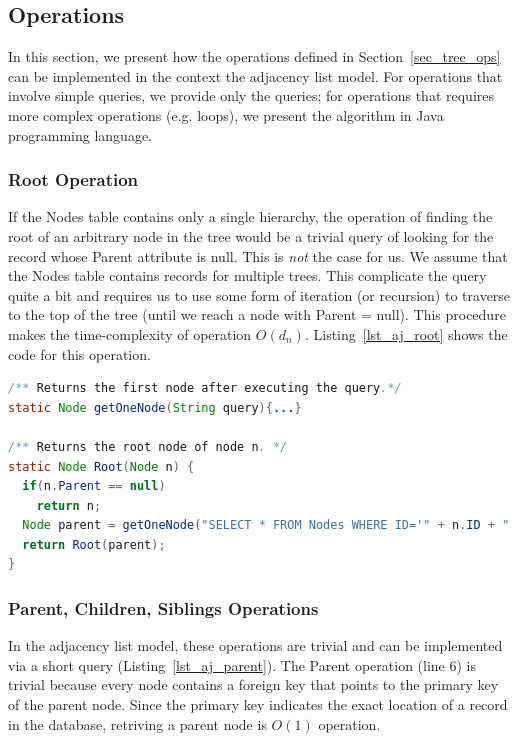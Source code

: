 \subsection{Operations}

In this section, we present how the operations defined in Section~\ref{sec_tree_ops} can be implemented in the context the adjacency list model. For operations that involve simple queries, we provide only the queries; for operations that requires more complex operations (e.g. loops), we present the algorithm in Java programming language.

\subsubsection{Root Operation}

If the Nodes table contains only a single hierarchy, the operation of finding the root of an arbitrary node in the tree would be a trivial query of looking for the record whose Parent attribute is null. This is \emph{not} the case for us. We assume that the Nodes table contains records for multiple trees. This complicate the query quite a bit and requires us to use some form of iteration (or recursion) to traverse to the top of the tree (until we reach a node with Parent = null). This procedure makes the time-complexity of operation $O(d_n)$. Listing~\ref{lst_aj_root} shows the code for this operation.

\begin{lstlisting}[language=java,caption=Root for Adjacency List, label=lst_aj_root, float]
/** Returns the first node after executing the query.*/
static Node getOneNode(String query){...}

/** Returns the root node of node n. */
static Node Root(Node n) {
  if(n.Parent == null)
    return n;
  Node parent = getOneNode("SELECT * FROM Nodes WHERE ID='" + n.ID + "'");
  return Root(parent);
}

\end{lstlisting}


\subsubsection{Parent, Children, Siblings Operations}\label{sec_al_trivial_ops}

In the adjacency list model, these operations are trivial and can be implemented via a short query (Listing~\ref{lst_aj_parent}). The Parent operation (line 6) is trivial because every node contains a foreign key that points to the primary key of the parent node. Since the primary key indicates the exact location of a record in the database, retriving a parent node is $O(1)$ operation.

